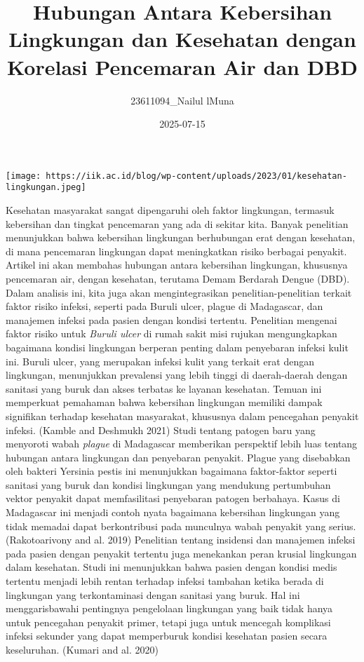 \documentclass[
]{article}
\title{Hubungan Antara Kebersihan Lingkungan dan Kesehatan dengan
Korelasi Pencemaran Air dan DBD}
\author{23611094\_Nailul lMuna}
\date{2025-07-15}
\begin{document}
\maketitle

\texttt{[image: https://iik.ac.id/blog/wp-content/uploads/2023/01/kesehatan-lingkungan.jpeg]}

Kesehatan masyarakat sangat dipengaruhi oleh faktor lingkungan, termasuk
kebersihan dan tingkat pencemaran yang ada di sekitar kita. Banyak
penelitian menunjukkan bahwa kebersihan lingkungan berhubungan erat
dengan kesehatan, di mana pencemaran lingkungan dapat meningkatkan
risiko berbagai penyakit. Artikel ini akan membahas hubungan antara
kebersihan lingkungan, khususnya pencemaran air, dengan kesehatan,
terutama Demam Berdarah Dengue (DBD). Dalam analisis ini, kita juga akan
mengintegrasikan penelitian-penelitian terkait faktor risiko infeksi,
seperti pada Buruli ulcer, plague di Madagascar, dan manajemen infeksi
pada pasien dengan kondisi tertentu. Penelitian mengenai faktor risiko
untuk \emph{Buruli ulcer} di rumah sakit misi rujukan mengungkapkan
bagaimana kondisi lingkungan berperan penting dalam penyebaran infeksi
kulit ini. Buruli ulcer, yang merupakan infeksi kulit yang terkait erat
dengan lingkungan, menunjukkan prevalensi yang lebih tinggi di
daerah-daerah dengan sanitasi yang buruk dan akses terbatas ke layanan
kesehatan. Temuan ini memperkuat pemahaman bahwa kebersihan lingkungan
memiliki dampak signifikan terhadap kesehatan masyarakat, khususnya
dalam pencegahan penyakit infeksi. (Kamble and Deshmukh 2021) Studi
tentang patogen baru yang menyoroti wabah \emph{plague} di Madagascar
memberikan perspektif lebih luas tentang hubungan antara lingkungan dan
penyebaran penyakit. Plague yang disebabkan oleh bakteri Yersinia pestis
ini menunjukkan bagaimana faktor-faktor seperti sanitasi yang buruk dan
kondisi lingkungan yang mendukung pertumbuhan vektor penyakit dapat
memfasilitasi penyebaran patogen berbahaya. Kasus di Madagascar ini
menjadi contoh nyata bagaimana kebersihan lingkungan yang tidak memadai
dapat berkontribusi pada munculnya wabah penyakit yang serius.
(Rakotoarivony and al. 2019) Penelitian tentang insidensi dan manajemen
infeksi pada pasien dengan penyakit tertentu juga menekankan peran
krusial lingkungan dalam kesehatan. Studi ini menunjukkan bahwa pasien
dengan kondisi medis tertentu menjadi lebih rentan terhadap infeksi
tambahan ketika berada di lingkungan yang terkontaminasi dengan sanitasi
yang buruk. Hal ini menggarisbawahi pentingnya pengelolaan lingkungan
yang baik tidak hanya untuk pencegahan penyakit primer, tetapi juga
untuk mencegah komplikasi infeksi sekunder yang dapat memperburuk
kondisi kesehatan pasien secara keseluruhan. (Kumari and al. 2020)
\end{document}
